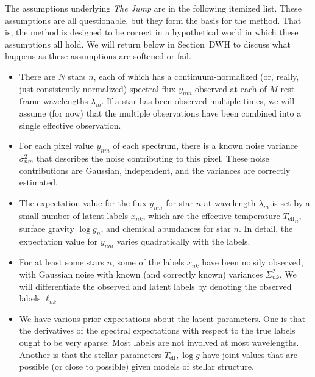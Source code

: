 \documentclass[12pt, letterpaper]{article}
\newcommand{\project}[1]{\textsl{{#1}}}
\newcommand{\sectionname}{Section}
\newcommand{\Teff}{{T_{\mathrm{eff}}}}
\newcommand{\logg}{{\log g}}
\begin{document}
The assumptions underlying \project{The Jump} are in the following
itemized list. These assumptions are all questionable, but they form
the basis for the method. That is, the method is designed to be correct
in a hypothetical world in which these assumptions all hold. We will
return below in \sectionname~DWH to discuss what happens as these
assumptions are softened or fail.
\begin{itemize}\itemsep0ex
\item There are $N$ stars $n$, each of which has a
  continuum-normalized (or, really, just consistently normalized)
  spectral flux $y_{nm}$ observed at each of $M$ rest-frame
  wavelengths $\lambda_m$. If a star has been observed multiple times,
  we will assume (for now) that the multiple observations have been
  combined into a single effective observation.
\item For each pixel value $y_{nm}$ of each spectrum, there is a known
  noise variance $\sigma^2_{nm}$ that describes the noise contributing
  to this pixel. These noise contributions are Gaussian, independent,
  and the variances are correctly estimated.
\item The expectation value for the flux $y_{nm}$ for star $n$ at
  wavelength $\lambda_m$ is set by a small number of latent labels
  $x_{nk}$, which are the effective temperature $\Teff_n$,
  surface gravity $\logg_n$, and chemical abundances for star $n$.
  In detail, the expectation value for $y_{nm}$ varies quadratically
  with the labels.
\item For at least some stars $n$, some of the labels $x_{nk}$ have
  been noisily observed, with Gaussian noise with known (and correctly
  known) variances $\Sigma^2_{nk}$. We will differentiate the observed
  and latent labels by denoting the observed labels $\ell_{nk}$.
\item We have various prior expectations about the latent parameters.
  One is that the derivatives of the spectral expectations with
  respect to the true labels ought to be very sparse: Most labels are
  not involved at most wavelengths. Another is that the stellar
  parameters $\Teff, \logg$ have joint values that are possible (or
  close to possible) given models of stellar structure.
\end{itemize}
\end{document}
